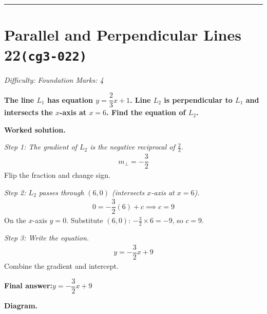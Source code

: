 \documentclass[11pt]{article}
\newcommand{\question}[1]{\par\medskip\noindent\textbf{#1}\par}
\begin{document}
\medskip\hrule

\section*{Parallel and Perpendicular Lines 22\quad\small\texttt{(cg3-022)}}
\textit{Difficulty: Foundation \quad\textbar\quad Marks: 4}

\question{The line \( L_1 \) has equation \( y = \dfrac{2}{3}x + 1 \). Line \( L_2 \) is perpendicular to \( L_1 \) and intersects the \( x \)-axis at \( x = 6 \). Find the equation of \( L_2 \).}

\textbf{Worked solution.}

\textit{Step 1: The gradient of \( L_2 \) is the negative reciprocal of \( \frac{2}{3} \).}
\[\begin{gathered}
m_\perp = -\dfrac{3}{2}
\end{gathered}\]
Flip the fraction and change sign.

\textit{Step 2: \( L_2 \) passes through \( (6, 0) \) (intersects \( x \)-axis at \( x = 6 \)).}
\[\begin{gathered}
0 = -\dfrac{3}{2}(6) + c \implies c = 9
\end{gathered}\]
On the \( x \)-axis \( y = 0 \). Substitute \( (6, 0) \): \( -\tfrac{3}{2} \times 6 = -9 \), so \( c = 9 \).

\textit{Step 3: Write the equation.}
\[\begin{gathered}
y = -\dfrac{3}{2}x + 9
\end{gathered}\]
Combine the gradient and intercept.

\begin{answerbox}
\textbf{Final answer:}\quad \(\displaystyle y = -\dfrac{3}{2}x + 9\)
\end{answerbox}
\textbf{Diagram.}
\end{document}

